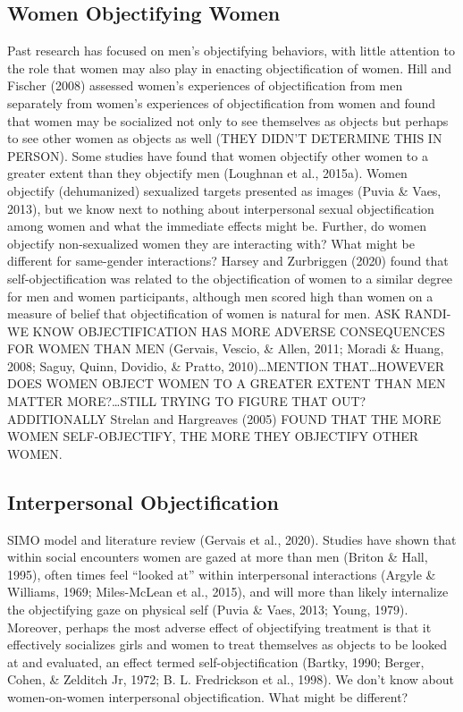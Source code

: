 \documentclass[man]{apa6}
\begin{document}
\subsection{Women Objectifying Women}\label{women-objectifying-women}

Past research has focused on men's objectifying behaviors, with little
attention to the role that women may also play in enacting
objectification of women. Hill and Fischer (2008) assessed women's
experiences of objectification from men separately from women's
experiences of objectification from women and found that women may be
socialized not only to see themselves as objects but perhaps to see
other women as objects as well (THEY DIDN'T DETERMINE THIS IN PERSON).
Some studies have found that women objectify other women to a greater
extent than they objectify men (Loughnan et al., 2015a). Women objectify
(dehumanized) sexualized targets presented as images (Puvia \& Vaes,
2013), but we know next to nothing about interpersonal sexual
objectification among women and what the immediate effects might be.
Further, do women objectify non-sexualized women they are interacting
with? What might be different for same-gender interactions? Harsey and
Zurbriggen (2020) found that self-objectification was related to the
objectification of women to a similar degree for men and women
participants, although men scored high than women on a measure of belief
that objectification of women is natural for men. ASK RANDI-WE KNOW
OBJECTIFICATION HAS MORE ADVERSE CONSEQUENCES FOR WOMEN THAN MEN
(Gervais, Vescio, \& Allen, 2011; Moradi \& Huang, 2008; Saguy, Quinn,
Dovidio, \& Pratto, 2010)\ldots{}MENTION THAT\ldots{}HOWEVER DOES WOMEN
OBJECT WOMEN TO A GREATER EXTENT THAN MEN MATTER MORE?\ldots{}STILL
TRYING TO FIGURE THAT OUT? ADDITIONALLY Strelan and Hargreaves (2005)
FOUND THAT THE MORE WOMEN SELF-OBJECTIFY, THE MORE THEY OBJECTIFY OTHER
WOMEN.

\subsection{Interpersonal
Objectification}\label{interpersonal-objectification}

SIMO model and literature review (Gervais et al., 2020). Studies have
shown that within social encounters women are gazed at more than men
(Briton \& Hall, 1995), often times feel \enquote{looked at} within
interpersonal interactions (Argyle \& Williams, 1969; Miles-McLean et
al., 2015), and will more than likely internalize the objectifying gaze
on physical self (Puvia \& Vaes, 2013; Young, 1979). Moreover, perhaps
the most adverse effect of objectifying treatment is that it effectively
socializes girls and women to treat themselves as objects to be looked
at and evaluated, an effect termed self-objectification (Bartky, 1990;
Berger, Cohen, \& Zelditch Jr, 1972; B. L. Fredrickson et al., 1998). We
don't know about women-on-women interpersonal objectification. What
might be different?
\end{document}
